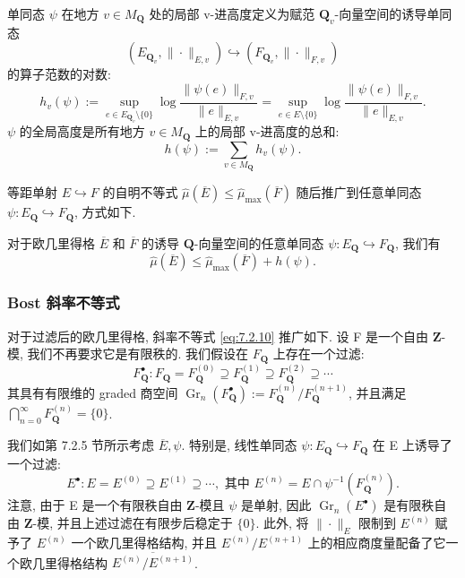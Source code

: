 \begin{definition}\label{def:7.2.8}
单同态 \(\psi\) 在地方 \(v \in M_{\mathbf{Q}}\) 处的局部 v-进高度定义为赋范 \(\mathbf{Q}_v\)-向量空间的诱导单同态
\[ (E_{\mathbf{Q}_v}, \|\cdot\|_{E,v}) \hookrightarrow (F_{\mathbf{Q}_v}, \|\cdot\|_{F,v}) \]
的算子范数的对数:
\[ h_v(\psi) := \sup_{e \in E_{\mathbf{Q}_v} \setminus \{0\}} \log \frac{\|\psi(e)\|_{F,v}}{\|e\|_{E,v}} = \sup_{e \in E \setminus \{0\}} \log \frac{\|\psi(e)\|_{F,v}}{\|e\|_{E,v}}. \]
\(\psi\) 的全局高度是所有地方 \(v \in M_{\mathbf{Q}}\) 上的局部 v-进高度的总和:
\[ h(\psi) := \sum_{v \in M_{\mathbf{Q}}} h_v(\psi). \]
\end{definition}

等距单射 \(E \hookrightarrow F\) 的自明不等式 \(\widehat{\mu}(\overline{E}) \leq \widehat{\mu}_{\max}(\overline{F})\) 
随后推广到任意单同态 \(\psi : E_{\mathbf{Q}} \hookrightarrow F_{\mathbf{Q}}\), 方式如下.



\begin{lemma}\label{lem:7.2.9}
对于欧几里得格 $\overline{E}$ 和 $\overline{F}$ 
的诱导 $\mathbf{Q}$-向量空间的任意单同态 $\psi \colon E_{\mathbf{Q}} \hookrightarrow F_{\mathbf{Q}}$, 我们有
\begin{equation}\label{eq:7.2.10}
\widehat{\mu}(\overline{E}) \le \widehat{\mu}_{\max}(\overline{F}) + h(\psi).
\end{equation}
\end{lemma}

\subsubsection{Bost 斜率不等式}\label{sec:7.2.11}

对于过滤后的欧几里得格, 斜率不等式 \eqref{eq:7.2.10} 推广如下. 
设 F 是一个自由 \(\mathbf{Z}\)-模, 我们不再要求它是有限秩的. 
我们假设在 \(F_{\mathbf{Q}}\) 上存在一个过滤:
\[ F_{\mathbf{Q}}^{\bullet}: F_{\mathbf{Q}} = F_{\mathbf{Q}}^{(0)} \supseteq F_{\mathbf{Q}}^{(1)} \supseteq F_{\mathbf{Q}}^{(2)} \supseteq \cdots \]
其具有有限维的 graded 商空间 \(\operatorname{Gr}_n(F_{\mathbf{Q}}^{\bullet}) := F_{\mathbf{Q}}^{(n)}/F_{\mathbf{Q}}^{(n+1)}\), 
并且满足 \(\bigcap_{n=0}^{\infty} F_{\mathbf{Q}}^{(n)} = \{0\}\).

我们如第 7.2.5 节所示考虑 \(\overline{E}, \psi\). 
特别是, 线性单同态 \(\psi: E_{\mathbf{Q}} \hookrightarrow F_{\mathbf{Q}}\) 在 E 上诱导了一个过滤:
\[ E^{\bullet}: E = E^{(0)} \supseteq E^{(1)} \supseteq \cdots, \text{ 其中 } E^{(n)} = E \cap \psi^{-1}(F_{\mathbf{Q}}^{(n)}). \]
注意, 由于 E 是一个有限秩自由 \(\mathbf{Z}\)-模且 \(\psi\) 是单射, 
因此 \(\operatorname{Gr}_n(E^{\bullet})\) 是有限秩自由 \(\mathbf{Z}\)-模, 
并且上述过滤在有限步后稳定于 \(\{0\}\). 
此外, 将 \(\|\cdot\|_E\) 限制到 \(E^{(n)}\) 赋予了 \(E^{(n)}\) 一个欧几里得格结构, 
并且 \(E^{(n)}/E^{(n+1)}\) 上的相应商度量配备了它一个欧几里得格结构 \(\overline{E^{(n)}/E^{(n+1)}}\).

